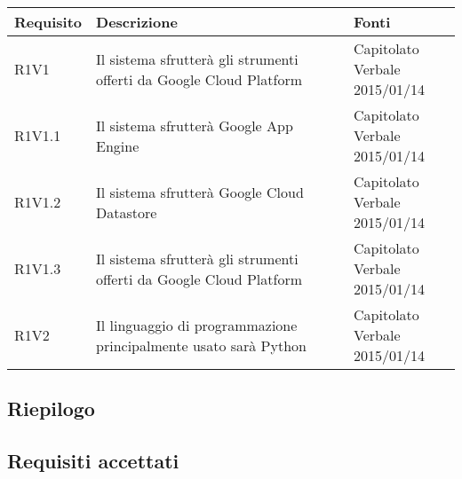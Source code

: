\begin{center}

	\def\arraystretch{1.5}
	\bgroup
	\begin{longtable}{| l | l | l |}
		\hline
		\textbf{Requisito} & \textbf{Descrizione} & \textbf{Fonti} \\
		\hline

		R1V1   & \parbox[t]{\dimDesc}{Il sistema sfrutterà gli strumenti offerti da Google Cloud Platform}  & \parbox[t]{\dimFonti}{ Capitolato \\ Verbale 2015/01/14 \\} \\
		\hline
		R1V1.1   & \parbox[t]{\dimDesc}{Il sistema sfrutterà Google App Engine}  & \parbox[t]{\dimFonti}{ Capitolato \\ Verbale 2015/01/14 \\} \\
		\hline
		R1V1.2   & \parbox[t]{\dimDesc}{Il sistema sfrutterà Google Cloud Datastore}  & \parbox[t]{\dimFonti}{ Capitolato \\ Verbale 2015/01/14 \\} \\
		\hline
		R1V1.3   & \parbox[t]{\dimDesc}{Il sistema sfrutterà gli strumenti offerti da Google Cloud Platform}  & \parbox[t]{\dimFonti}{ Capitolato \\ Verbale 2015/01/14 \\} \\
		\hline
		R1V2   & \parbox[t]{\dimDesc}{Il linguaggio di programmazione principalmente usato sarà Python}  & \parbox[t]{\dimFonti}{ Capitolato \\ Verbale 2015/01/14 \\} \\
		\hline

	\end{longtable}
	\egroup
\end{center}

\subsection{Riepilogo}

\subsection{Requisiti accettati}
